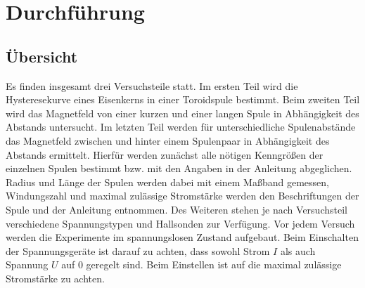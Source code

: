 \section{Durchführung}
\subsection{Übersicht}
Es finden insgesamt drei Versuchsteile statt. 
Im ersten Teil wird die Hysteresekurve eines Eisenkerns in einer Toroidspule bestimmt.
Beim zweiten Teil wird das Magnetfeld von einer kurzen und einer langen Spule in Abhängigkeit des Abstands untersucht.
Im letzten Teil werden für unterschiedliche Spulenabstände das Magnetfeld zwischen und hinter einem Spulenpaar in Abhängigkeit des Abstands ermittelt.
Hierfür werden zunächst alle nötigen Kenngrößen der einzelnen Spulen bestimmt bzw. mit den Angaben in der Anleitung \cite[]{man:v308} abgeglichen.
Radius und Länge der Spulen werden dabei mit einem Maßband gemessen,
Windungszahl und maximal zulässige Stromstärke werden den Beschriftungen der Spule und der Anleitung entnommen.
Des Weiteren stehen je nach Versuchsteil verschiedene Spannungstypen und Hallsonden zur Verfügung.
Vor jedem Versuch werden die Experimente im spannungslosen Zustand aufgebaut.
Beim Einschalten der Spannungsgeräte ist darauf zu achten, dass sowohl Strom $I$ als auch Spannung $U$ auf 0 geregelt sind.
Beim Einstellen ist auf die maximal zulässige Stromstärke zu achten.








